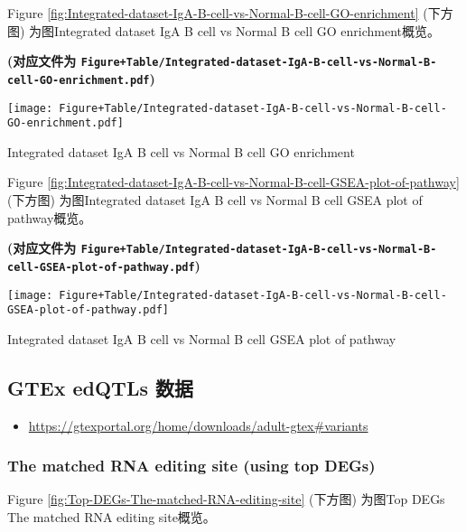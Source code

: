 \documentclass[
]{article}
\providecommand{\tightlist}{%
  \setlength{\itemsep}{0pt}\setlength{\parskip}{0pt}}
\begin{document}
Figure \ref{fig:Integrated-dataset-IgA-B-cell-vs-Normal-B-cell-GO-enrichment} (下方图) 为图Integrated dataset IgA B cell vs Normal B cell GO enrichment概览。

\textbf{(对应文件为 \texttt{Figure+Table/Integrated-dataset-IgA-B-cell-vs-Normal-B-cell-GO-enrichment.pdf})}

\def\@captype{figure}
\begin{center}
\texttt{[image: Figure+Table/Integrated-dataset-IgA-B-cell-vs-Normal-B-cell-GO-enrichment.pdf]}
\caption{Integrated dataset IgA B cell vs Normal B cell GO enrichment}\label{fig:Integrated-dataset-IgA-B-cell-vs-Normal-B-cell-GO-enrichment}
\end{center}

Figure \ref{fig:Integrated-dataset-IgA-B-cell-vs-Normal-B-cell-GSEA-plot-of-pathway} (下方图) 为图Integrated dataset IgA B cell vs Normal B cell GSEA plot of pathway概览。

\textbf{(对应文件为 \texttt{Figure+Table/Integrated-dataset-IgA-B-cell-vs-Normal-B-cell-GSEA-plot-of-pathway.pdf})}

\def\@captype{figure}
\begin{center}
\texttt{[image: Figure+Table/Integrated-dataset-IgA-B-cell-vs-Normal-B-cell-GSEA-plot-of-pathway.pdf]}
\caption{Integrated dataset IgA B cell vs Normal B cell GSEA plot of pathway}\label{fig:Integrated-dataset-IgA-B-cell-vs-Normal-B-cell-GSEA-plot-of-pathway}
\end{center}

\hypertarget{gtex-edqtls-ux6570ux636e}{%
\subsection{GTEx edQTLs 数据}\label{gtex-edqtls-ux6570ux636e}}

\begin{itemize}
\tightlist
\item
  \url{https://gtexportal.org/home/downloads/adult-gtex\#variants}
\end{itemize}

\hypertarget{the-matched-rna-editing-site-using-top-degs}{%
\subsubsection{The matched RNA editing site (using top DEGs)}\label{the-matched-rna-editing-site-using-top-degs}}

Figure \ref{fig:Top-DEGs-The-matched-RNA-editing-site} (下方图) 为图Top DEGs The matched RNA editing site概览。
\end{document}
